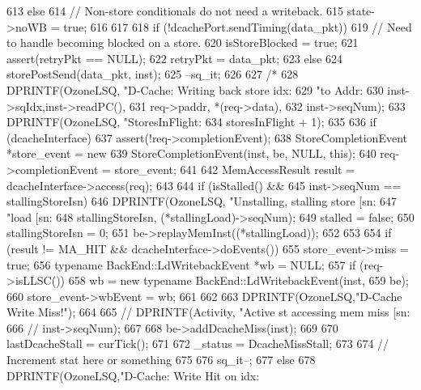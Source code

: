 \begin{DoxyCode}
{{{613         } else {
614             // Non-store conditionals do not need a writeback.
615             state->noWB = true;
616         }
617 
618         if (!dcachePort.sendTiming(data_pkt)) {
619             // Need to handle becoming blocked on a store.
620             isStoreBlocked = true;
621             assert(retryPkt == NULL);
622             retryPkt = data_pkt;
623         } else {
624             storePostSend(data_pkt, inst);
625             --sq_it;
626         }
627 /*
628         DPRINTF(OzoneLSQ, "D-Cache: Writing back store idx:%
629                 "to Addr:%
630                 inst->sqIdx,inst->readPC(),
631                 req->paddr, *(req->data),
632                 inst->seqNum);
633         DPRINTF(OzoneLSQ, "StoresInFlight: %
634                 storesInFlight + 1);
635 
636         if (dcacheInterface) {
637             assert(!req->completionEvent);
638             StoreCompletionEvent *store_event = new
639                 StoreCompletionEvent(inst, be, NULL, this);
640             req->completionEvent = store_event;
641 
642             MemAccessResult result = dcacheInterface->access(req);
643 
644             if (isStalled() &&
645                 inst->seqNum == stallingStoreIsn) {
646                 DPRINTF(OzoneLSQ, "Unstalling, stalling store [sn:%
647                         "load [sn:%
648                         stallingStoreIsn, (*stallingLoad)->seqNum);
649                 stalled = false;
650                 stallingStoreIsn = 0;
651                 be->replayMemInst((*stallingLoad));
652             }
653 
654             if (result != MA_HIT && dcacheInterface->doEvents()) {
655                 store_event->miss = true;
656                 typename BackEnd::LdWritebackEvent *wb = NULL;
657                 if (req->isLLSC()) {
658                     wb = new typename BackEnd::LdWritebackEvent(inst,
659                                                             be);
660                     store_event->wbEvent = wb;
661                 }
662 
663                 DPRINTF(OzoneLSQ,"D-Cache Write Miss!\n");
664 
665 //                DPRINTF(Activity, "Active st accessing mem miss [sn:%
666 //                        inst->seqNum);
667 
668                 be->addDcacheMiss(inst);
669 
670                 lastDcacheStall = curTick();
671 
672                 _status = DcacheMissStall;
673 
674                 // Increment stat here or something
675 
676                 sq_it--;
677             } else {
678                 DPRINTF(OzoneLSQ,"D-Cache: Write Hit on idx:%
}}}}
\end{DoxyCode}
